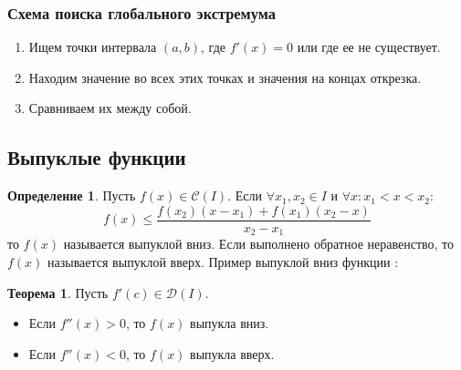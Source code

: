 \documentclass[a4paper, 12pt]{article}
\theoremstyle{definition}
\newtheorem*{definition}{Определение}
\newtheorem*{theorem}{Теорема}
\begin{document}
        \subsubsection*{Схема поиска глобального экстремума}
        \begin{enumerate}
            \item Ищем точки интервала $(a,b)$, где $f'(x)=0$ или где ее не существует. 
            \item Находим значение во всех этих точках и значения на концах открезка.
            \item Сравниваем их между собой.
        \end{enumerate}
        \subsection{Выпуклые функции}
        \begin{definition}
            Пусть $f(x)\in \mathcal{C}(I)$. Если $\forall x_1,x_2\in I$ и $\forall x: x_1<x<x_2$:
            \[f(x)\leq \frac{f(x_2)(x-x_1)+f(x_1)(x_2-x)}{x_2-x_1}\]
            то $f(x)$ называется выпуклой вниз. Если выполнено обратное неравенство, то $f(x)$ называется выпуклой вверх. Пример выпуклой вниз функции :
        \end{definition} 
        \begin{center}
        \end{center}
        \begin{theorem}
            Пусть $f'(c)\in \mathcal{D}(I)$.
            \begin{itemize}
                \item Если $f''(x)>0$, то $f(x)$ выпукла вниз.
                \item Если $f''(x)<0$, то $f(x)$ выпукла вверх.
            \end{itemize}
        \end{theorem} 
\end{document}
